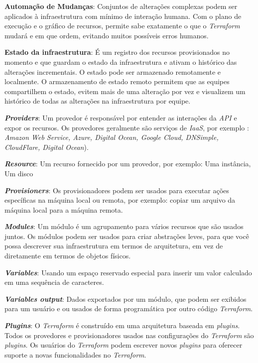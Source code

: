 \textbf{Automação de Mudanças}: Conjuntos de alterações complexas podem ser aplicados à infraestrutura com mínimo de interação humana. Com o plano de execução e o gráfico de recursos, permite sabe exatamente o que o \textit{Terraform} mudará e em que ordem, evitando muitos possíveis erros humanos.

\textbf{Estado da infraestrutura}: É um registro dos recursos provisionados no momento e que guardam o estado da infraestrutura e ativam o histórico das alterações incrementais. O estado pode ser armazenado remotamente e localmente. O armazenamento de estado remoto permitem que as equipes compartilhem o estado, evitem mais de uma alteração por vez e visualizem um histórico de todas as alterações na infraestrutura por equipe.

\textbf{\textit{Providers}}: Um provedor é responsável por entender as interações da \textit{API} e expor os recursos. Os provedores geralmente são serviços de \textit{IaaS},  por exemplo : \textit{Amazon
Web Service, Azure, Digital Ocean, Google Cloud, DNSimple, CloudFlare, Digital Ocean}).

\textbf{\textit{Resource}}: Um recurso fornecido por um provedor, por exemplo: Uma instância, Um disco   

\textbf{\textit{Provisioners}}: Os provisionadores podem ser usados para executar ações específicas na máquina local ou remota, por exemplo: copiar um arquivo da máquina local para a máquina remota.

\textbf{\textit{Modules}}: Um módulo é um agrupamento para vários recursos que são usados juntos. Os módulos podem ser usados para criar abstrações leves, para que você possa descrever sua infraestrutura em termos de arquitetura, em vez de diretamente em termos de objetos físicos.

\textbf{\textit{Variables}}: Usando um espaço reservado especial para inserir um valor calculado em uma sequência de caracteres. 

 \textbf{\textit{Variables output}}: Dados exportados por um módulo, que podem ser exibidos para um usuário e  ou usados de forma programática por outro código \textit{Terraform}.
 
 \textbf{\textit{Plugins}}: O \textit{Terraform} é construído em uma arquitetura baseada em \textit{plugins}. Todos os provedores e provisionadores usados nas configurações do \textit{Terraform} são \textit{plugins}. Os usuários do \textit{Terraform} podem escrever novos \textit{plugins} para oferecer suporte a novas funcionalidades no \textit{Terraform}.
 
